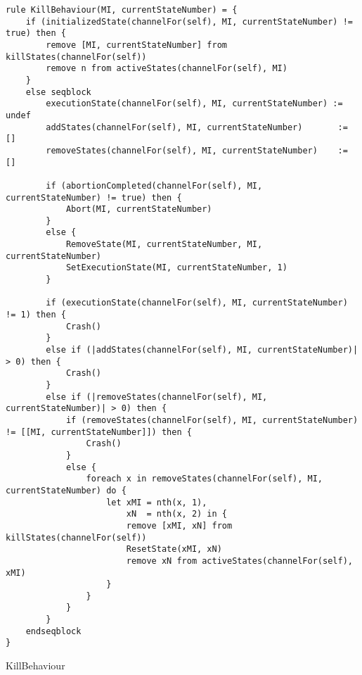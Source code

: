\begin{listing}[H]
\begin{verbatim}
rule KillBehaviour(MI, currentStateNumber) = {
    if (initializedState(channelFor(self), MI, currentStateNumber) != true) then {
        remove [MI, currentStateNumber] from killStates(channelFor(self))
        remove n from activeStates(channelFor(self), MI)
    }
    else seqblock
        executionState(channelFor(self), MI, currentStateNumber) := undef
        addStates(channelFor(self), MI, currentStateNumber)       := []
        removeStates(channelFor(self), MI, currentStateNumber)    := []

        if (abortionCompleted(channelFor(self), MI, currentStateNumber) != true) then {
            Abort(MI, currentStateNumber)
        }
        else {
            RemoveState(MI, currentStateNumber, MI, currentStateNumber)
            SetExecutionState(MI, currentStateNumber, 1)
        }

        if (executionState(channelFor(self), MI, currentStateNumber) != 1) then {
            Crash()
        }
        else if (|addStates(channelFor(self), MI, currentStateNumber)| > 0) then {
            Crash()
        }
        else if (|removeStates(channelFor(self), MI, currentStateNumber)| > 0) then {
            if (removeStates(channelFor(self), MI, currentStateNumber) != [[MI, currentStateNumber]]) then {
                Crash()
            }
            else {
                foreach x in removeStates(channelFor(self), MI, currentStateNumber) do {
                    let xMI = nth(x, 1),
                        xN  = nth(x, 2) in {
                        remove [xMI, xN] from killStates(channelFor(self))
                        ResetState(xMI, xN)
                        remove xN from activeStates(channelFor(self), xMI)
                    }
                }
            }
        }
    endseqblock
}
\end{verbatim}
\caption{KillBehaviour}
\label{lst:asm:KillBehaviour}
\end{listing}




